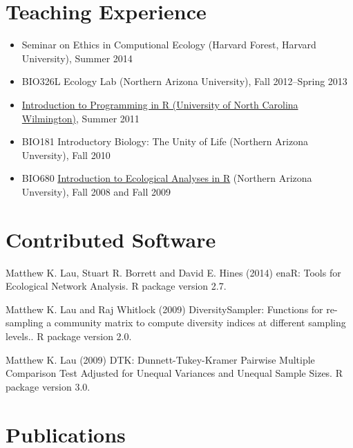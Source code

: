 \documentclass[]{article}
\begin{document}
\section{Teaching Experience}\label{teaching-experience}

\begin{itemize}
\item
  Seminar on Ethics in Computional Ecology (Harvard Forest, Harvard
  University), Summer 2014
\item
  BIO326L Ecology Lab (Northern Arizona University), Fall 2012--Spring
  2013
\item
  \href{http://people.uncw.edu/borretts/courses/RworkshopUNCW.pdf}{Introduction
  to Programming in R (University of North Carolina Wilmington)}, Summer
  2011
\item
  BIO181 Introductory Biology: The Unity of Life (Northern Arizona
  Unversity), Fall 2010
\item
  BIO680
  \href{http://www.mpcer.nau.edu/igert/eco_analysis_r.html}{Introduction
  to Ecological Analyses in R} (Northern Arizona Unversity), Fall 2008
  and Fall 2009
\end{itemize}

\section{Contributed Software}\label{contributed-software}

{Matthew K. Lau, Stuart R. Borrett and David E. Hines (2014) enaR: Tools
for Ecological Network Analysis. R package version 2.7.}

{Matthew K. Lau and Raj Whitlock (2009) DiversitySampler: Functions for
re-sampling a community matrix to compute diversity indices at different
sampling levels.. R package version 2.0.}

{Matthew K. Lau (2009) DTK: Dunnett-Tukey-Kramer Pairwise Multiple
Comparison Test Adjusted for Unequal Variances and Unequal Sample Sizes.
R package version 3.0.}

\section{Publications}\label{publications}
\end{document}
